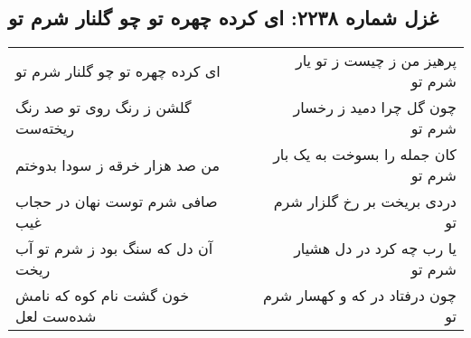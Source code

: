 \begin{center}
\section*{غزل شماره ۲۲۳۸: ای کرده چهره تو چو گلنار شرم تو}
\label{sec:2238}
\begin{longtable}{l p{0.5cm} r}
ای کرده چهره تو چو گلنار شرم تو
&&
پرهیز من ز چیست ز تو یار شرم تو
\\
گلشن ز رنگ روی تو صد رنگ ریخته‌ست
&&
چون گل چرا دمید ز رخسار شرم تو
\\
من صد هزار خرقه ز سودا بدوختم
&&
کان جمله را بسوخت به یک بار شرم تو
\\
صافی شرم توست نهان در حجاب غیب
&&
دردی بریخت بر رخ گلزار شرم تو
\\
آن دل که سنگ بود ز شرم تو آب ریخت
&&
یا رب چه کرد در دل هشیار شرم تو
\\
خون گشت نام کوه که نامش شده‌ست لعل
&&
چون درفتاد در که و کهسار شرم تو
\\
\end{longtable}
\end{center}
